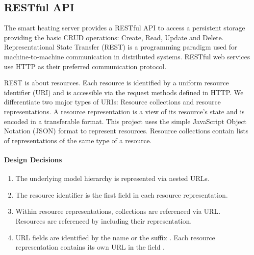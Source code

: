 \subsection{RESTful API}
\label{sec:server_infrastructure_restful_api}

The smart heating server provides a RESTful API to access a persistent storage providing the basic CRUD operations: Create, Read, Update and Delete.
Representational State Transfer (REST) is a programming paradigm used for machine-to-machine communication in distributed systems.
RESTful web services use HTTP as their preferred communication protocol.

REST is about resources.
Each resource is identified by a uniform resource identifier (URI) and is accessible via the request methods defined in HTTP.
We differentiate two major types of URIs: Resource collections and resource representations.
A resource representation is a view of its resource's state and is encoded in a transferable format.
This project uses the simple JavaScript Object Notation (JSON) format to represent resources.
Resource collections contain lists of representations of the same type of a resource.

\paragraph{Design Decisions}

\begin{enumerate}
    \itemsep0em
    \item The underlying model hierarchy is represented via nested URLs.
    \label{enum:design_decision_nested_urls}
    
    \item The resource identifier is the first field in each resource representation.
    \label{enum:design_decision_identifier_first_field}
    
    \item Within resource representations, collections are referenced via URL. Resources are referenced by including their representation.
    \label{enum:design_decision_resource_referencing}
    
    \item URL fields are identified by the name  or the suffix . Each resource representation contains its own URL in the field .
    \label{enum:design_decision_url_fields_prefix}
\end{enumerate}


